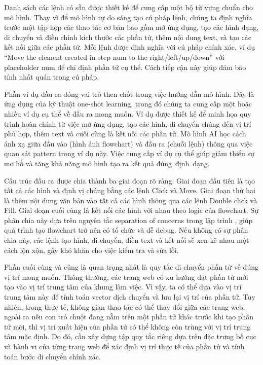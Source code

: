 \documentclass[a4paper, 12pt]{report}
\begin{document}
{Danh sách các lệnh có sẵn được thiết kế để cung cấp một bộ từ vựng chuẩn cho mô hình. Thay vì để mô hình tự do sáng tạo cú pháp lệnh, chúng ta định nghĩa trước một tập hợp các thao tác cơ bản bao gồm mở ứng dụng, tạo các hình dạng, di chuyển và điều chỉnh kích thước các phần tử, thêm nội dung text, và tạo các kết nối giữa các phần tử. Mỗi lệnh được định nghĩa với cú pháp chính xác, ví dụ ``Move the element created in step {num} to the right/left/up/down'' với placeholder {num} để chỉ định phần tử cụ thể. Cách tiếp cận này giúp đảm bảo tính nhất quán trong cú pháp.



Phần ví dụ đầu ra đóng vai trò then chốt trong việc hướng dẫn mô hình. Đây là ứng dụng của kỹ thuật one-shot learning, trong đó chúng ta cung cấp một hoặc nhiều ví dụ cụ thể về đầu ra mong muốn. Ví dụ được thiết kế để minh họa quy trình hoàn chỉnh từ việc mở ứng dụng, tạo các hình, di chuyển chúng đến vị trí phù hợp, thêm text và cuối cùng là kết nối các phần tử. Mô hình AI học cách ánh xạ giữa đầu vào (hình ảnh flowchart) và đầu ra (chuỗi lệnh) thông qua việc quan sát pattern trong ví dụ này. Việc cung cấp ví dụ cụ thể giúp giảm thiểu sự mơ hồ và tăng khả năng mô hình tạo ra kết quả đúng~định~dạng.



Cấu trúc đầu ra được chia thành ba giai đoạn rõ ràng. Giai đoạn đầu tiên là tạo tất cả các hình và định vị chúng bằng các lệnh Click và Move. Giai đoạn thứ hai là thêm nội dung văn bản vào tất cả các hình thông qua các lệnh Double click và Fill. Giai đoạn cuối cùng là kết nối các hình với nhau theo logic của flowchart. Sự phân chia này dựa trên nguyên tắc separation of concerns trong lập trình \cite{enwiki:1325643770}, giúp quá trình tạo flowchart trở nên có tổ chức và dễ debug. Nếu không có sự phân chia này, các lệnh tạo hình, di chuyển, điền text và kết nối sẽ xen kẽ nhau một cách lộn xộn, gây khó khăn cho việc kiểm tra và sửa lỗi.


Phần cuối cùng và cũng là quan trọng nhất là quy tắc di chuyển phần tử về đúng vị trí mong muốn. Thông thường, các trang web có xu hướng đặt phần tử mới tạo vào vị trí trung tâm của khung làm việc. Vì vậy, ta có thể dựa vào vị trí trung tâm này để tính toán vector dịch chuyển và lưu lại vị trí của phần tử. Tuy nhiên, trong thực tế, không gian thao tác có thể thay đổi giữa các trang web; ngoài ra nếu con trỏ chuột đang nằm trên một phần tử khác trước khi tạo phần tử mới, thì vị trí xuất hiện của phần tử có thể không còn trùng với vị trí trung tâm mặc định. Do đó, cần xây dựng tập quy tắc riêng dựa trên đặc trưng bố cục và hành vi của từng trang web để xác định vị trí thực tế của phần tử và tính toán bước di chuyển chính xác.

}
\end{document}
